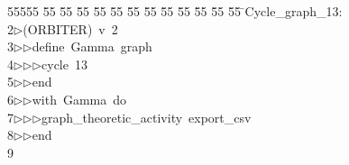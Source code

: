 %
%
\begin{tabbing}
55555 \= 55 \= 55 \= 55 \= 55 \= 55 \= 55 \= 55 \= 55 \= 55 \= 55 \= 55 \= 55 \= \>Cycle\_graph\_13:\\[0pt]
2\>$\triangleright$\>(ORBITER)\ v\ 2\ \\[0pt]
3\>$\triangleright$\>$\triangleright$\>define\ Gamma\ graph\ \\[0pt]
4\>$\triangleright$\>$\triangleright$\>$\triangleright$\>cycle\ 13\ \\[0pt]
5\>$\triangleright$\>$\triangleright$\>end\ \\[0pt]
6\>$\triangleright$\>$\triangleright$\>with\ Gamma\ do\ \\[0pt]
7\>$\triangleright$\>$\triangleright$\>$\triangleright$\>graph\_theoretic\_activity\ export\_csv\ \\[0pt]
8\>$\triangleright$\>$\triangleright$\>end\\[0pt]
9\>\end{tabbing}
